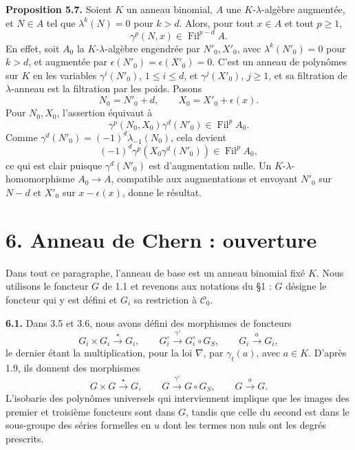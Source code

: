 \documentclass[11pt]{article}
\newcommand{\Fil}{\operatorname{Fil}}
\begin{document}
\textbf{Proposition 5.7.} Soient \(K\) un anneau binomial, \(A\) une \(K\)-\(\lambda\)-algèbre augmentée, et \(N\in A\) tel que \(\lambda^k(N)=0\) pour \(k>d\). Alors, pour tout \(x\in A\) et tout \(p\ge1\),
\begin{equation}\tag{5.7.1}
  \gamma^p(N,x)\in\Fil^{p-d}A.
\end{equation}
En effet, soit \(A_0\) la \(K\)-\(\lambda\)-algèbre engendrée par \(N'_0,X'_0\), avec \(\lambda^k(N'_0)=0\) pour \(k>d\), et augmentée par \(\epsilon(N'_0)=\epsilon(X'_0)=0\). C'est un anneau de polynômes sur \(K\) en les variables \(\gamma^i(N'_0)\), \(1\le i\le d\), et \(\gamma^j(X'_0)\), \(j\ge1\), et sa filtration de \(\lambda\)-anneau est la filtration par les poids. Posons
\[
  N_0=N'_0+d,
  \qquad X_0=X'_0+\epsilon(x).
\]
Pour \(N_0,X_0\), l'assertion équivaut à
\[
  \gamma^p(N_0,X_0)\gamma^d(N'_0)\in\Fil^pA_0.
\]
Comme \(\gamma^d(N'_0)=(-1)^d\lambda_{-1}(N_0)\), cela devient
\[
  (-1)^d\gamma^p(X_0\gamma^d(N'_0))\in\Fil^pA_0,
\]
ce qui est clair puisque \(\gamma^d(N'_0)\) est d'augmentation nulle. Un \(K\)-\(\lambda\)-homomorphisme \(A_0\to A\), compatible aux augmentations et envoyant \(N'_0\) sur \(N-d\) et \(X'_0\) sur \(x-\epsilon(x)\), donne le résultat.

\section*{6. Anneau de Chern : ouverture}

Dans tout ce paragraphe, l'anneau de base est un anneau binomial fixé \(K\). Nous utilisons le foncteur \(G\) de 1.1 et revenons aux notations du §1 : \(G\) désigne le foncteur qui y est défini et \(G_i\) sa restriction à \(\mathscr C_0\).

\textbf{6.1.} Dans 3.5 et 3.6, nous avons défini des morphismes de foncteurs
\[
  G_i\times G_i\xrightarrow{\star}G_i,
  \qquad
  G_i^\circ\xrightarrow{\gamma'}G_i^\circ\circ G_S,
  \qquad
  G_i\xrightarrow{a}G_i,
\]
le dernier étant la multiplication, pour la loi \(\nabla\), par \(\gamma_t(a)\), avec \(a\in K\). D'après 1.9, ils donnent des morphismes
\[
  G\times G\xrightarrow{\star}G,
  \qquad
  G\xrightarrow{\gamma'}G\circ G_S,
  \qquad
  G\xrightarrow{a}G.
\]
L'isobarie des polynômes universels qui interviennent implique que les images des premier et troisième foncteurs sont dans \(G\), tandis que celle du second est dans le sous-groupe des séries formelles en \(u\) dont les termes non nuls ont les degrés prescrits.
\end{document}

